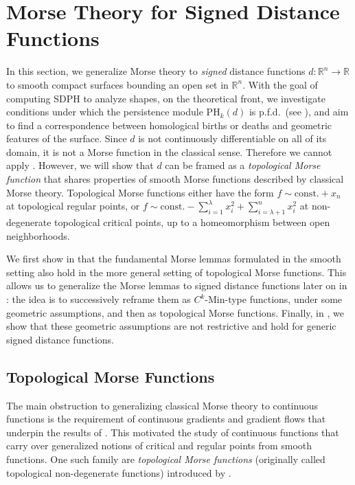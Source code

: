 \documentclass[11pt]{article}
\newcommand{\R}{\mathbb{R}}
\newcommand{\PH}{\mathrm{PH}}
\theoremstyle{plain}
\theoremstyle{definition}
\theoremstyle{remark}
\begin{document}
	
	\section{Morse Theory for Signed Distance Functions}
	\label{sec:morse_theory_signdist}
	
	In this section, we generalize Morse theory to \emph{signed} distance functions $d : \R^n \to \R$ to smooth compact surfaces bounding an open set in $\R^n$. With the goal of computing SDPH to analyze shapes, on the theoretical front, we investigate conditions under which the persistence module $\PH_k(d)$ is p.f.d.~(see ), and aim to find a correspondence between homological births or deaths and geometric features of the surface.
	Since $d$ is not continuously differentiable on all of its domain, it is not a Morse function in the classical sense. Therefore we cannot apply . 
	However, we will show that $d$ can be framed as a \emph{topological Morse function} that shares properties of smooth Morse functions described by classical Morse theory. Topological Morse functions either have the form $f \sim \mathrm{const.} + x_n$ at topological regular points, or $f \sim \mathrm{const.} - \sum_{i = 1}^{\lambda} x_i^2 + \sum_{i = \lambda + 1}^{n} x_i^2$ at non-degenerate topological critical points, up to a homeomorphism between open neighborhoods.
	
	We first show in  that the fundamental Morse lemmas formulated in the smooth setting also hold in the more general setting of topological Morse functions.
	This allows us to generalize the Morse lemmas to signed distance functions later on in : the idea is to successively reframe them as $C^k$-Min-type functions, under some geometric assumptions, and then as topological Morse functions.
	Finally, in , we show that these geometric assumptions are not restrictive and hold for generic signed distance functions.
	
	\subsection{Topological Morse Functions}
	\label{sec:topological_morse_theory}
	
	
	The main obstruction to generalizing classical Morse theory to continuous functions is the requirement of continuous gradients and gradient flows that underpin the results of . This motivated the study of continuous functions that carry over generalized notions of critical and regular points from smooth functions. One such family are \emph{topological Morse functions} (originally called topological non-degenerate functions) introduced by \cite{morse_topologically_1959}.
	
\end{document}
